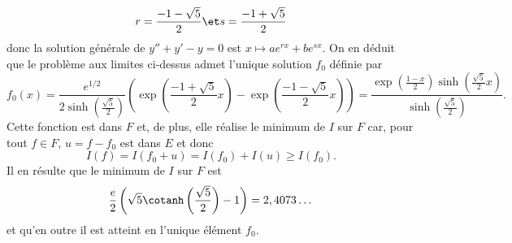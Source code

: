 \begin{enonce}
\begin{solution}
\begin{enumerate}
\begin{equation*}
    r=\frac{-1-\sqrt5}2 \et s=\frac{-1+\sqrt5}2
\end{equation*}
donc la solution générale de $y''+y'-y=0$ est $x\mapsto ae^{rx}+be^{sx}$. On en déduit que le problème aux limites ci-dessus admet l'unique solution $f_0$ définie par
\begin{equation*}
f_0(x)
    =\frac{e^{1/2}}{2\sinh\left( \frac{\sqrt5}2 \right) }
    \left(
        \exp\left( \frac{-1+\sqrt5}2 x \right) 
        -\exp\left( \frac{-1-\sqrt5}2 x \right) 
    \right) 
    =\frac{\exp\left(\frac{1-x}2\right)\sinh\left( \frac{\sqrt5}2x \right)}
        {\sinh\left( \frac{\sqrt5}2 \right) }.
\end{equation*}
Cette fonction est dans $F$ et, de plus, elle réalise le minimum de $I$ sur $F$ car, pour tout $f\in F$, $u=f-f_0$ est dans $E$ et donc
\begin{equation*}
I(f)=I(f_0+u)=I(f_0)+I(u) \geq I(f_0).
\end{equation*}
Il en résulte que le minimum de $I$ sur $F$ est
\begin{equation*}
\frac e2\left( \sqrt5\cotanh\left( \frac{\sqrt5}2 \right) -1\right) =2,4073\dots
\end{equation*}
et qu'en outre il est atteint en l'unique élément $f_0$.
\end{enumerate}
\end{solution}
\end{enonce}
